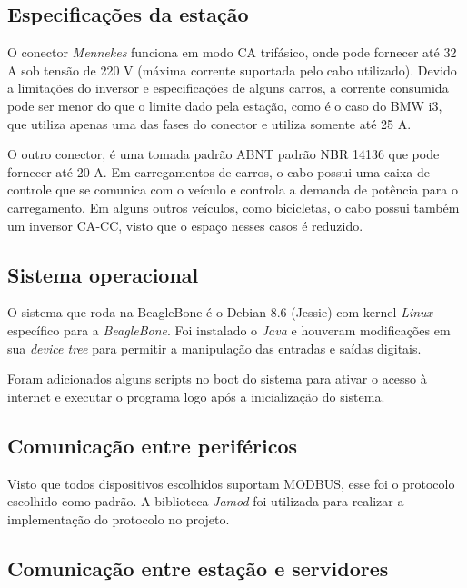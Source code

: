     \subsection{Especificações da estação}
    \label{methodology:structure:specs}

      O conector \textit{Mennekes} funciona em modo \ac{CA} trifásico, onde pode fornecer até 32 A sob tensão de 220 V (máxima corrente suportada pelo cabo utilizado). Devido a limitações do inversor e especificações de alguns carros, a corrente consumida pode ser menor do que o limite dado pela estação, como é o caso do BMW i3, que utiliza apenas uma das fases do conector e utiliza somente até 25 A. 

      O outro conector, é uma tomada padrão ABNT padrão NBR 14136 \cite{nbr-14136} que pode fornecer até 20 A. Em carregamentos de carros, o cabo possui uma caixa de controle que se comunica com o veículo e controla a demanda de potência para o carregamento. Em alguns outros veículos, como bicicletas, o cabo possui também um inversor \ac{CA}-\ac{CC}, visto que o espaço nesses casos é reduzido.

    \subsection{Sistema operacional}
    \label{methodology:structure:os}

      O sistema que roda na BeagleBone é o Debian 8.6 (Jessie) com kernel \textit{Linux} específico para a \textit{BeagleBone}. Foi instalado o \textit{Java} e houveram modificações em sua \textit{device tree} para permitir a manipulação das entradas e saídas digitais.

      Foram adicionados alguns scripts no boot do sistema para ativar o acesso à internet e executar o programa logo após a inicialização do sistema.

    \subsection{Comunicação entre periféricos}
    \label{methodology:structure:com}

      Visto que todos dispositivos escolhidos suportam MODBUS, esse foi o protocolo escolhido como padrão. A biblioteca \textit{Jamod} foi utilizada para realizar a implementação do protocolo no projeto.

    \subsection{Comunicação entre estação e servidores}
    \label{methodology:structure:ocpp}

